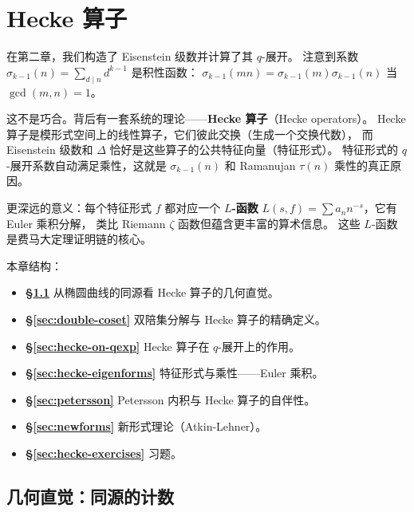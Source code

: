 \chapter{Hecke 算子}
\label{ch:hecke}

在第二章，我们构造了 Eisenstein 级数并计算了其 $q$-展开。
注意到系数 $\sigma_{k-1}(n) = \sum_{d \mid n} d^{k-1}$ 是积性函数：
$\sigma_{k-1}(mn) = \sigma_{k-1}(m)\sigma_{k-1}(n)$ 当 $\gcd(m,n)=1$。

这不是巧合。背后有一套系统的理论——\textbf{Hecke 算子}（Hecke operators）。
Hecke 算子是模形式空间上的线性算子，它们彼此交换（生成一个交换代数），
而 Eisenstein 级数和 $\Delta$ 恰好是这些算子的公共特征向量（特征形式）。
特征形式的 $q$-展开系数自动满足乘性，这就是 $\sigma_{k-1}(n)$ 和 Ramanujan $\tau(n)$ 乘性的真正原因。

更深远的意义：每个特征形式 $f$ 都对应一个 \textbf{$L$-函数}
$L(s,f) = \sum a_n n^{-s}$，它有 Euler 乘积分解，
类比 Riemann $\zeta$ 函数但蕴含更丰富的算术信息。
这些 $L$-函数是费马大定理证明链的核心。

本章结构：
\begin{itemize}
  \item \textbf{§\ref{sec:hecke-motivation}} 从椭圆曲线的同源看 Hecke 算子的几何直觉。
  \item \textbf{§\ref{sec:double-coset}} 双陪集分解与 Hecke 算子的精确定义。
  \item \textbf{§\ref{sec:hecke-on-qexp}} Hecke 算子在 $q$-展开上的作用。
  \item \textbf{§\ref{sec:hecke-eigenforms}} 特征形式与乘性——Euler 乘积。
  \item \textbf{§\ref{sec:petersson}} Petersson 内积与 Hecke 算子的自伴性。
  \item \textbf{§\ref{sec:newforms}} 新形式理论（Atkin-Lehner）。
  \item \textbf{§\ref{sec:hecke-exercises}} 习题。
\end{itemize}


\section{几何直觉：同源的计数}
\label{sec:hecke-motivation}

